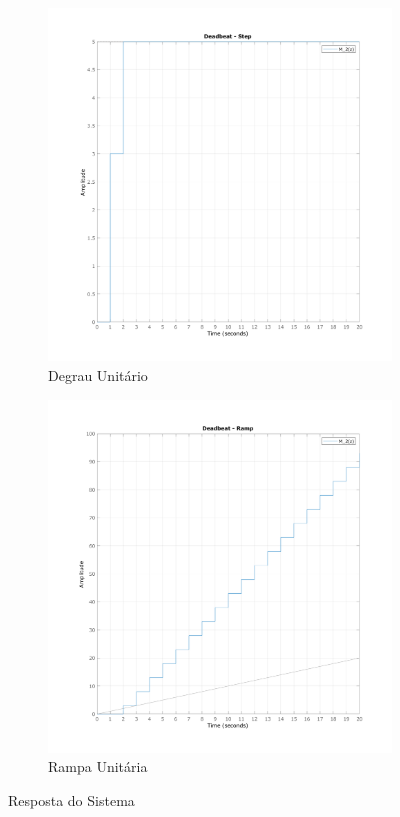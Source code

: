 \documentclass[a4paper,11pt]{article}
\begin{document}
\begin{figure}[H]
    \centering
    \begin{subfigure}[m]{0.49\linewidth}
        \centering
        \includegraphics[width=1\linewidth]{img/exsim5-g2-step-sim.png}
        \caption{Degrau Unitário}
    \end{subfigure}
    \hfill
    \begin{subfigure}[m]{0.49\linewidth}
        \centering
        \includegraphics[width=1\linewidth]{img/exsim5-g2-deadbeat-sim.png}
        \caption{Rampa Unitária}
    \end{subfigure}
    \caption{Resposta do Sistema}
\end{figure}
\end{document}
